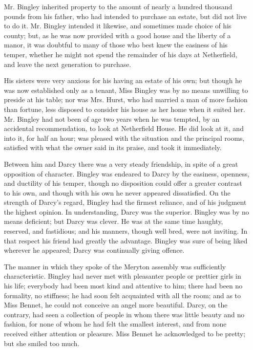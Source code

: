 \documentclass[10pt]{book}
\begin{document}
   Mr. Bingley inherited property to the amount of nearly a hundred
thousand pounds from his father, who had intended to purchase an estate,
but did not live to do it. Mr. Bingley intended it likewise, and
sometimes made choice of his county; but, as he was now provided with a
good house and the liberty of a manor, it was doubtful to many of those
who best knew the easiness of his temper, whether he might not spend the
remainder of his days at Netherfield, and leave the next generation to
purchase.
  

   His sisters were very anxious for his having an estate of his own; but
though he was now established only as a tenant, Miss Bingley was by no
means unwilling to preside at his table; nor was Mrs. Hurst, who had
married a man of more fashion than fortune, less disposed to consider
his house as her home when it suited her. Mr. Bingley had not been of
age two years when he was tempted, by an accidental recommendation, to
look at Netherfield House. He did look at it, and into it, for half an
hour; was pleased with the situation and the principal rooms, satisfied
with what the owner said in its praise, and took it immediately.
  

   Between him and Darcy there was a very steady
   friendship, in spite of a
great opposition of character. Bingley was endeared to Darcy by the
easiness, openness, and ductility of his temper, though no disposition
could offer a greater contrast to his own, and though with his own he
never appeared dissatisfied. On the strength of Darcy’s regard, Bingley
had the firmest reliance, and of his judgment the highest opinion. In
understanding, Darcy was the superior. Bingley was by no means
deficient; but Darcy was clever. He was at the same time haughty,
reserved, and fastidious; and his manners, though well bred, were not
inviting. In that respect his friend had greatly the advantage. Bingley
was sure of being liked wherever he appeared; Darcy was continually
giving offence.
  

   The manner in which they spoke of the Meryton assembly was sufficiently
characteristic. Bingley had never met with pleasanter people or prettier
girls in his life; everybody had been most kind and attentive to him;
there had been no formality, no stiffness; he had soon felt acquainted
with all the room; and as to Miss Bennet, he could not conceive an angel
more beautiful. Darcy, on the contrary, had seen a collection of people
in whom there was little beauty and no fashion, for none of whom he had
felt the smallest interest, and from none received either attention or
pleasure. Miss Bennet he acknowledged to be pretty; but she smiled too
much.
  
\end{document}
